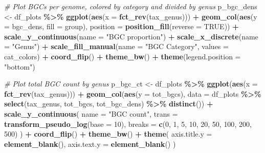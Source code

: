 \documentclass[
]{article}
\newenvironment{Shaded}{\begin{snugshade}}{\end{snugshade}}
\newcommand{\AttributeTok}[1]{\textcolor[rgb]{0.13,0.29,0.53}{#1}}
\newcommand{\CommentTok}[1]{\textcolor[rgb]{0.56,0.35,0.01}{\textit{#1}}}
\newcommand{\ConstantTok}[1]{\textcolor[rgb]{0.56,0.35,0.01}{#1}}
\newcommand{\DecValTok}[1]{\textcolor[rgb]{0.00,0.00,0.81}{#1}}
\newcommand{\FunctionTok}[1]{\textcolor[rgb]{0.13,0.29,0.53}{\textbf{#1}}}
\newcommand{\NormalTok}[1]{#1}
\newcommand{\OtherTok}[1]{\textcolor[rgb]{0.56,0.35,0.01}{#1}}
\newcommand{\SpecialCharTok}[1]{\textcolor[rgb]{0.81,0.36,0.00}{\textbf{#1}}}
\newcommand{\StringTok}[1]{\textcolor[rgb]{0.31,0.60,0.02}{#1}}
\begin{document}
\begin{Shaded}
\begin{Highlighting}[]
\CommentTok{\# Plot BGCs per genome, colored by category and divided by genus}
\NormalTok{p\_bgc\_dens }\OtherTok{\textless{}{-}}\NormalTok{ df\_plots }\SpecialCharTok{\%\textgreater{}\%}
  \FunctionTok{ggplot}\NormalTok{(}\FunctionTok{aes}\NormalTok{(}\AttributeTok{x =} \FunctionTok{fct\_rev}\NormalTok{(tax\_genus))) }\SpecialCharTok{+}
  \FunctionTok{geom\_col}\NormalTok{(}\FunctionTok{aes}\NormalTok{(}\AttributeTok{y =}\NormalTok{ bgc\_dens, }\AttributeTok{fill =}\NormalTok{ group), }\AttributeTok{position =} \FunctionTok{position\_fill}\NormalTok{(}\AttributeTok{reverse =} \ConstantTok{TRUE}\NormalTok{)) }\SpecialCharTok{+}
  \FunctionTok{scale\_y\_continuous}\NormalTok{(}\AttributeTok{name =} \StringTok{"BGC proportion"}\NormalTok{) }\SpecialCharTok{+}
  \FunctionTok{scale\_x\_discrete}\NormalTok{(}\AttributeTok{name =} \StringTok{"Genus"}\NormalTok{) }\SpecialCharTok{+}
  \FunctionTok{scale\_fill\_manual}\NormalTok{(}\AttributeTok{name =} \StringTok{"BGC Category"}\NormalTok{, }\AttributeTok{values =}\NormalTok{ cat\_colors) }\SpecialCharTok{+}
  \FunctionTok{coord\_flip}\NormalTok{() }\SpecialCharTok{+}
  \FunctionTok{theme\_bw}\NormalTok{() }\SpecialCharTok{+}
  \FunctionTok{theme}\NormalTok{(}\AttributeTok{legend.position =} \StringTok{"bottom"}\NormalTok{)}

\CommentTok{\# Plot total BGC count by genus}
\NormalTok{p\_bgc\_ct }\OtherTok{\textless{}{-}}\NormalTok{ df\_plots }\SpecialCharTok{\%\textgreater{}\%}
  \FunctionTok{ggplot}\NormalTok{(}\FunctionTok{aes}\NormalTok{(}\AttributeTok{x =} \FunctionTok{fct\_rev}\NormalTok{(tax\_genus))) }\SpecialCharTok{+}
  \FunctionTok{geom\_col}\NormalTok{(}\FunctionTok{aes}\NormalTok{(}\AttributeTok{y =}\NormalTok{ tot\_bgcs), }\AttributeTok{data =}\NormalTok{ df\_plots }\SpecialCharTok{\%\textgreater{}\%} \FunctionTok{select}\NormalTok{(tax\_genus, tot\_bgcs, tot\_bgc\_dens) }\SpecialCharTok{\%\textgreater{}\%} \FunctionTok{distinct}\NormalTok{()) }\SpecialCharTok{+}
  \FunctionTok{scale\_y\_continuous}\NormalTok{(}
    \AttributeTok{name =} \StringTok{"BGC count"}\NormalTok{,}
    \AttributeTok{trans =} \FunctionTok{transform\_pseudo\_log}\NormalTok{(}\AttributeTok{base =} \DecValTok{10}\NormalTok{),}
    \AttributeTok{breaks =} \FunctionTok{c}\NormalTok{(}\DecValTok{0}\NormalTok{, }\DecValTok{1}\NormalTok{, }\DecValTok{5}\NormalTok{, }\DecValTok{10}\NormalTok{, }\DecValTok{20}\NormalTok{, }\DecValTok{50}\NormalTok{, }\DecValTok{100}\NormalTok{, }\DecValTok{200}\NormalTok{, }\DecValTok{500}\NormalTok{)}
\NormalTok{  ) }\SpecialCharTok{+}
  \FunctionTok{coord\_flip}\NormalTok{() }\SpecialCharTok{+}
  \FunctionTok{theme\_bw}\NormalTok{() }\SpecialCharTok{+}
  \FunctionTok{theme}\NormalTok{(}
    \AttributeTok{axis.title.y =} \FunctionTok{element\_blank}\NormalTok{(),}
    \AttributeTok{axis.text.y =} \FunctionTok{element\_blank}\NormalTok{()}
\NormalTok{  )}


\end{Highlighting}
\end{Shaded}
\end{document}
